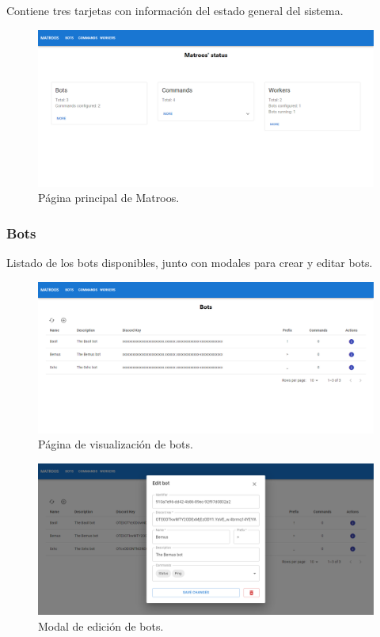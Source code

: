 Contiene tres tarjetas con información del estado general del sistema.

\begin{figure}[H]
	\centering
	\includegraphics[width=1\textwidth]{img/front/page-home.png}
	\caption{Página principal de Matroos.}
\end{figure}

\subsubsection{Bots}

Listado de los bots disponibles, junto con modales para crear y editar bots.

\begin{figure}[H]
	\centering
	\includegraphics[width=1\textwidth]{img/front/page-bots.png}
	\caption{Página de visualización de bots.}
\end{figure}

\begin{figure}[H]
	\centering
	\includegraphics[width=1\textwidth]{img/front/page-bots-edit.png}
	\caption{Modal de edición de bots.}
\end{figure}

